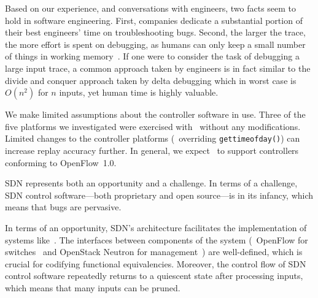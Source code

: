 
 Based on our experience, and
conversations with engineers, two
facts seem to hold in software engineering. First, companies dedicate
a substantial portion of their best engineers' time on troubleshooting bugs.
Second, the larger the trace, the more effort is spent on debugging, as humans
can only keep a small number of things in working memory~\cite{miller56seven}.
If one were to consider the task of debugging a large
input trace, a common approach taken by engineers is in fact similar to the
divide and conquer approach taken by delta debugging which in worst case is
$O(n^2)$ for $n$ inputs, yet human time is highly valuable.

 We make limited
assumptions about the controller software in use. Three of the five platforms
we investigated were exercised with \projectname~without any modifications.
Limited changes to the controller platforms (\eg~overriding
{\tt gettimeofday()}) can increase replay accuracy further.
In general, we expect \projectname~to support controllers conforming to
OpenFlow~1.0. %

 SDN represents both an
opportunity and a challenge. In terms of a challenge,
SDN control software---both proprietary and open source---is in its infancy, which means
that bugs are pervasive.

In terms of an opportunity, SDN's architecture facilitates the implementation
of systems like~\projectname. The
interfaces between components of the system
(\eg~OpenFlow for switches~\cite{openflow} and OpenStack
Neutron for management~\cite{quantum}) are well-defined, which is
crucial for codifying functional equivalencies. %
Moreover, the control flow of SDN control software repeatedly returns to
a quiescent state after processing inputs, which means that many inputs can be pruned.

